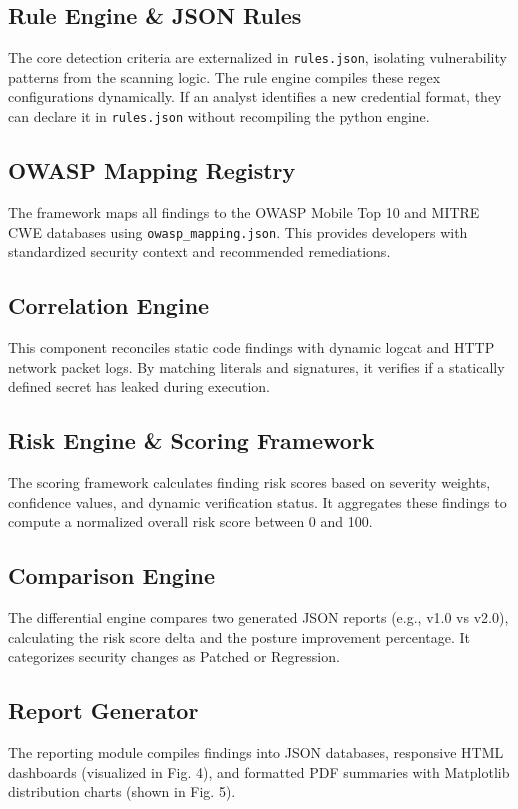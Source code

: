 \documentclass[conference]{
IEEEtran}
\begin{document}
\subsection{Rule Engine \& JSON Rules}
The core detection criteria are externalized in \texttt{rules.json}, isolating vulnerability patterns from the scanning logic. The rule engine compiles these regex configurations dynamically. If an analyst identifies a new credential format, they can declare it in \texttt{rules.json} without recompiling the python engine.

\subsection{OWASP Mapping Registry}
The framework maps all findings to the OWASP Mobile Top 10 and MITRE CWE databases using \texttt{owasp\_mapping.json}. This provides developers with standardized security context and recommended remediations.

\subsection{Correlation Engine}
This component reconciles static code findings with dynamic logcat and HTTP network packet logs. By matching literals and signatures, it verifies if a statically defined secret has leaked during execution.

\subsection{Risk Engine \& Scoring Framework}
The scoring framework calculates finding risk scores based on severity weights, confidence values, and dynamic verification status. It aggregates these findings to compute a normalized overall risk score between 0 and 100.

\subsection{Comparison Engine}
The differential engine compares two generated JSON reports (e.g., v1.0 vs v2.0), calculating the risk score delta and the posture improvement percentage. It categorizes security changes as Patched or Regression.

\subsection{Report Generator}
The reporting module compiles findings into JSON databases, responsive HTML dashboards (visualized in Fig. 4), and formatted PDF summaries with Matplotlib distribution charts (shown in Fig. 5).
\end{document}
